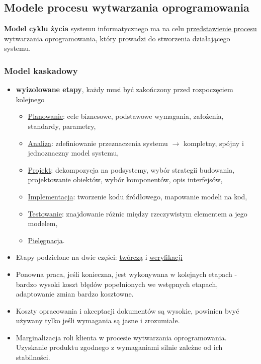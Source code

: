 \documentclass[a4paper]{article}
\begin{document}
    \subsection{Modele procesu wytwarzania oprogramowania}
    \textbf{Model cyklu życia} systemu informatycznego ma na celu \underline{przedstawienie procesu} wytwarzania
    oprogramowania, który prowadzi do stworzenia działającego systemu.


    \subsubsection{Model kaskadowy}
    \begin{itemize}
        \item \textbf{wyizolowane etapy}, każdy musi być zakończony przed rozpoczęciem kolejnego
        \begin{itemize}
            \item \underline{Planowanie}: cele biznesowe, podstawowe wymagania, założenia, standardy, parametry,
            \item \underline{Analiza}: zdefiniowanie przeznaczenia systemu $\rightarrow$ kompletny, spójny i jednoznaczny model systemu,
            \item \underline{Projekt}: dekompozycja na podsystemy, wybór strategii budowania, projektowanie obiektów, wybór komponentów, opis interfejsów,
            \item \underline{Implementacja}: tworzenie kodu źródłowego, mapowanie modeli na kod,
            \item \underline{Testowanie}: znajdowanie różnic między rzeczywistym elementem a jego modelem,
            \item \underline{Pielęgnacja}.
        \end{itemize}
        \item Etapy podzielone na dwie części: \underline{twórczą} i \underline{weryfikacji}
        \item Ponowna praca, jeśli konieczna, jest wykonywana w kolejnych etapach - bardzo wysoki koszt błędów
        popełnionych we wstępnych etapach, adaptowanie zmian bardzo kosztowne.
        \item Koszty opracowania i akceptacji dokumentów są wysokie, powinien bvyć używany
        tylko jeśli wymagania są jasne i zrozumiałe.
        \item Marginalizacja roli klienta w procesie wytwarzania oprogramowania. Uzyskanie produktu zgodnego z wymaganiami
        silnie zależne od ich stabilności.
    \end{itemize}
\end{document}

